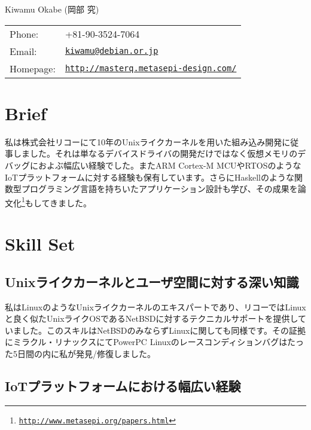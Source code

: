 \documentclass[letterpaper]{article}
\def\name{Kiwamu Okabe (岡部 究)}
\begin{document}
{\huge \name}


\vspace{0.25in}

\begin{minipage}{0.3\linewidth}
  \begin{tabular}{ll}
    Phone: & +81-90-3524-7064 \\
    Email: & \href{mailto:kiwamu@debian.or.jp}{\tt kiwamu@debian.or.jp} \\
    Homepage: & \href{http://masterq.metasepi-design.com/}{\tt http://masterq.metasepi-design.com/} \\
  \end{tabular}
\end{minipage}

\section*{Brief}

私は株式会社リコーにて10年のUnixライクカーネルを用いた組み込み開発に従事しました。それは単なるデバイスドライバの開発だけではなく仮想メモリのデバッグにおよぶ幅広い経験でした。またARM Cortex-M MCUやRTOSのようなIoTプラットフォームに対する経験も保有しています。さらにHaskellのような関数型プログラミング言語を持ちいたアプリケーション設計も学び、その成果を論文化\footnote{\href{http://www.metasepi.org/papers.html}{\tt http://www.metasepi.org/papers.html}}もしてきました。

\section*{Skill Set}

\subsection*{Unixライクカーネルとユーザ空間に対する深い知識}

私はLinuxのようなUnixライクカーネルのエキスパートであり、リコーではLinuxと良く似たUnixライクOSであるNetBSDに対するテクニカルサポートを提供していました。このスキルはNetBSDのみならずLinuxに関しても同様です。その証拠にミラクル・リナックスにてPowerPC Linuxのレースコンディションバグはたった5日間の内に私が発見/修復しました。

\subsection*{IoTプラットフォームにおける幅広い経験}
\end{document}
